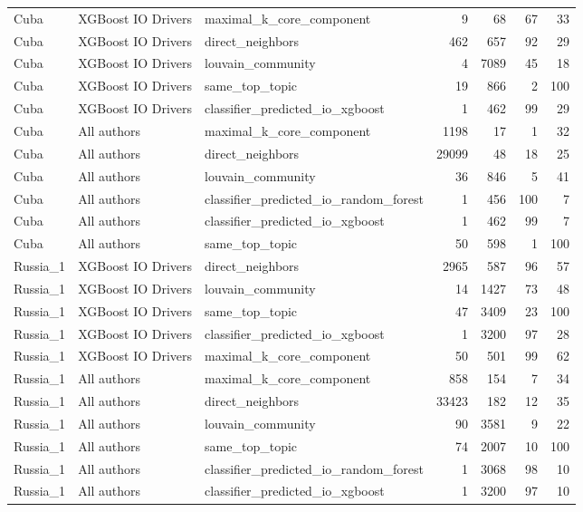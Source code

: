 \begin{tabular}{lllrrrr}
Cuba & XGBoost IO Drivers & maximal\_k\_core\_component & 9 & 68 & 67 & 33 \\
Cuba & XGBoost IO Drivers & direct\_neighbors & 462 & 657 & 92 & 29 \\
Cuba & XGBoost IO Drivers & louvain\_community & 4 & 7089 & 45 & 18 \\
Cuba & XGBoost IO Drivers & same\_top\_topic & 19 & 866 & 2 & 100 \\
Cuba & XGBoost IO Drivers & classifier\_predicted\_io\_xgboost & 1 & 462 & 99 & 29 \\
Cuba & All authors & maximal\_k\_core\_component & 1198 & 17 & 1 & 32 \\
Cuba & All authors & direct\_neighbors & 29099 & 48 & 18 & 25 \\
Cuba & All authors & louvain\_community & 36 & 846 & 5 & 41 \\
Cuba & All authors & classifier\_predicted\_io\_random\_forest & 1 & 456 & 100 & 7 \\
Cuba & All authors & classifier\_predicted\_io\_xgboost & 1 & 462 & 99 & 7 \\
Cuba & All authors & same\_top\_topic & 50 & 598 & 1 & 100 \\
Russia\_1 & XGBoost IO Drivers & direct\_neighbors & 2965 & 587 & 96 & 57 \\
Russia\_1 & XGBoost IO Drivers & louvain\_community & 14 & 1427 & 73 & 48 \\
Russia\_1 & XGBoost IO Drivers & same\_top\_topic & 47 & 3409 & 23 & 100 \\
Russia\_1 & XGBoost IO Drivers & classifier\_predicted\_io\_xgboost & 1 & 3200 & 97 & 28 \\
Russia\_1 & XGBoost IO Drivers & maximal\_k\_core\_component & 50 & 501 & 99 & 62 \\
Russia\_1 & All authors & maximal\_k\_core\_component & 858 & 154 & 7 & 34 \\
Russia\_1 & All authors & direct\_neighbors & 33423 & 182 & 12 & 35 \\
Russia\_1 & All authors & louvain\_community & 90 & 3581 & 9 & 22 \\
Russia\_1 & All authors & same\_top\_topic & 74 & 2007 & 10 & 100 \\
Russia\_1 & All authors & classifier\_predicted\_io\_random\_forest & 1 & 3068 & 98 & 10 \\
Russia\_1 & All authors & classifier\_predicted\_io\_xgboost & 1 & 3200 & 97 & 10 \\
\bottomrule
\end{tabular}
